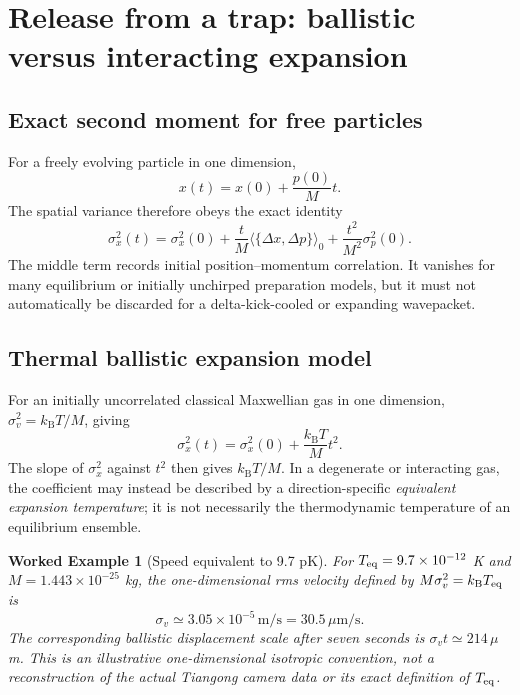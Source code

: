 \documentclass[11pt,a4paper]{article}
\newtheorem{example}{Worked Example}
\newcommand{\kb}{k_{\mathrm B}}
\begin{document}
\section{Release from a trap: ballistic versus interacting expansion}
\subsection{Exact second moment for free particles}
For a freely evolving particle in one dimension,
\begin{equation}x(t)=x(0)+\frac{p(0)}{M}t.\end{equation}
The spatial variance therefore obeys the exact identity
\begin{equation}
\sigma_x^2(t)=\sigma_x^2(0)+\frac{t}{M}\langle\{\Delta x,\Delta p\}\rangle_0+\frac{t^2}{M^2}\sigma_p^2(0).\label{eq:variance}
\end{equation}
The middle term records initial position--momentum correlation. It vanishes for many equilibrium or initially unchirped preparation models, but it must not automatically be discarded for a delta-kick-cooled or expanding wavepacket.

\subsection{Thermal ballistic expansion model}
For an initially uncorrelated classical Maxwellian gas in one dimension, $\sigma_v^2=\kb T/M$, giving
\begin{equation}\boxed{\sigma_x^2(t)=\sigma_x^2(0)+\frac{\kb T}{M}t^2.}\label{eq:thermalfit}\end{equation}
The slope of $\sigma_x^2$ against $t^2$ then gives $\kb T/M$. In a degenerate or interacting gas, the coefficient may instead be described by a direction-specific \emph{equivalent expansion temperature}; it is not necessarily the thermodynamic temperature of an equilibrium ensemble.

\begin{example}[Speed equivalent to 9.7 pK]
For $T_{\rm eq}=9.7\times10^{-12}$ K and $M=1.443\times10^{-25}$ kg, the one-dimensional rms velocity defined by $M\sigma_v^2=\kb T_{\rm eq}$ is
\[\sigma_v\simeq3.05\times10^{-5}\,\mathrm{m/s}=30.5\,\mu\mathrm{m/s}.\]
The corresponding ballistic displacement scale after seven seconds is $\sigma_vt\simeq214\,\mu$m. This is an \emph{illustrative one-dimensional isotropic convention}, not a reconstruction of the actual Tiangong camera data or its exact definition of $T_{\rm eq}$.
\end{example}
\end{document}
